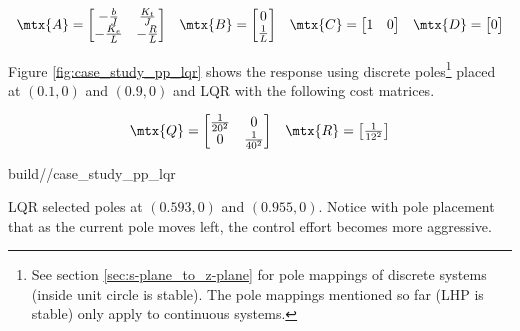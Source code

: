 \begin{align*}
  \begin{array}{cccc}
    \mtx{A} = \begin{bmatrix}
      -\frac{b}{J} & \frac{K_t}{J} \\
      -\frac{K_e}{L} & -\frac{R}{L}
    \end{bmatrix} &
    \mtx{B} = \begin{bmatrix}
      0 \\
      \frac{1}{L}
    \end{bmatrix} &
    \mtx{C} = \begin{bmatrix}
      1 & 0
    \end{bmatrix} &
    \mtx{D} = \begin{bmatrix}
      0
    \end{bmatrix}
  \end{array}
\end{align*}

Figure \ref{fig:case_study_pp_lqr} shows the response using discrete
poles\footnote{See section \ref{sec:s-plane_to_z-plane} for pole mappings of
discrete systems (inside unit circle is stable). The pole mappings mentioned so
far (LHP is stable) only apply to continuous systems.} placed at $(0.1, 0)$ and
$(0.9, 0)$ and LQR with the following cost matrices.

\begin{align*}
  \begin{array}{cc}
    \mtx{Q} = \begin{bmatrix}
      \frac{1}{20^2} & 0 \\
      0 & \frac{1}{40^2}
    \end{bmatrix} &
    \mtx{R} = \begin{bmatrix}
      \frac{1}{12^2}
    \end{bmatrix}
  \end{array}
\end{align*}

\begin{svg}{build/\chapterpath/case_study_pp_lqr}
  \caption{Second-order CIM motor response with pole placement and LQR}
  \label{fig:case_study_pp_lqr}
\end{svg}

LQR selected poles at $(0.593, 0)$ and $(0.955, 0)$. Notice with pole placement
that as the current pole moves left, the \gls{control effort} becomes more
aggressive.
